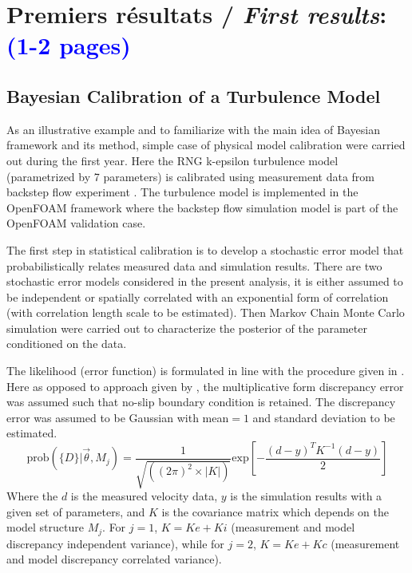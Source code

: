 \documentclass[11pt,titlepage]{article}
\begin{document}
\newpage
\section{Premiers résultats /  {\large\textit{First results}}: \textcolor{blue}{(1-2 pages)}}


\subsection{Bayesian Calibration of a Turbulence Model}

As an illustrative example and to familiarize with the main idea of Bayesian framework and its method, simple case of physical model calibration were carried out during the first year. Here the RNG k-epsilon turbulence model (parametrized by 7 parameters) is calibrated using measurement data from backstep flow experiment \cite{Kasagi1995}. The turbulence model is implemented in the OpenFOAM framework where the backstep flow simulation model is part of the OpenFOAM validation case.

The first step in statistical calibration is to develop a stochastic error model that probabilistically relates measured data and simulation results. There are two stochastic error models considered in the present analysis, it is either assumed to be independent or spatially correlated with an exponential form of correlation (with correlation length scale to be estimated). Then Markov Chain Monte Carlo simulation were carried out to characterize the posterior of the parameter conditioned on the data.

The likelihood (error function) is formulated in line with the procedure given in \cite{Cheung2011}. Here as opposed to approach given by \cite{KennedyOHagan2001}, the multiplicative form discrepancy error was assumed such that no-slip boundary condition is retained. The discrepancy error was assumed to be Gaussian with mean$=1$ and standard deviation to be estimated.
\begin{equation}
\text{prob}(\{D\} | \vec{\theta}, M_j) = \frac{1}{\sqrt{((2\pi)^2 \times|K|)}} \text{exp} \left[ - \frac{(d-y)^T K^{-1} (d-y)}{2} \right]
\end{equation}
Where the $d$ is the measured velocity data, $y$ is the simulation results with a given set of parameters, and $K$ is the covariance matrix which depends on the model structure $M_j$. For $j=1$, $K = Ke + Ki$ (measurement and model discrepancy independent variance), while for $j=2$, $K = Ke + Kc$ (measurement and model discrepancy correlated variance).
\end{document}
